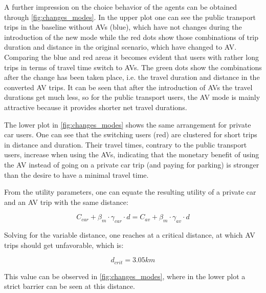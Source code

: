 A further impression on the choice behavior of the agents can be obtained through
\cref{fig:changes_modes}. In the upper plot one can see the public transport trips
in the baseline without AVs (blue), which have not changes during the introduction
of the new mode while the red dots show those combinations of trip duration and
distance in the original scenario, which have changed to AV. Comparing the blue
and red areas it becomes evident that users with rather long trips in terms of
travel time switch to AVs. The green dots show the combinations after the change
has been taken place, i.e. the travel duration and distance in the converted AV
trips. It can be seen that after the introduction of AVs the travel durations
get much less, so for the public transport users, the AV mode is mainly attractive
because it provides shorter net travel durations.

The lower plot in \cref{fig:changes_modes} shows the same arrangement for private
car users. One can see that the switching users (red) are clustered for short trips in
distance and duration. Their travel times, contrary to the public transport users,
increase when using the AVs, indicating that the monetary benefit of using the AV
instead of going on a private car trip (and paying for parking) is stronger than
the desire to have a minimal travel time.

From the utility parameters, one can equate the resulting utility of
a private car and an AV trip with the same distance:

\begin{equation}
C_{car} + \beta_m \cdot \gamma_{car} \cdot d = C_{av} + \beta_m \cdot \gamma_{av} \cdot d
\end{equation}

Solving for the variable distance, one reaches at a critical distance, at which
AV trips should get unfavorable, which is:

\begin{equation}
d_{crit} = 3.05 km
\end{equation}

This value can be observed in \cref{fig:changes_modes}, where in the lower plot
a strict barrier can be seen at this distance.

